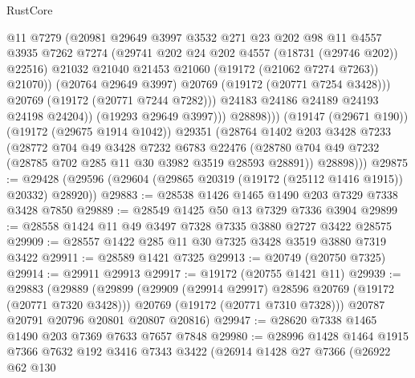 \begin{lexlean}{RustCore}
\begin{coremodule}
                          @11
                          @7279
                          (@20981
                            @29649
                            @3997
                            @3532
                            @271
                            @23
                            @202
                            @98
                            @11
                            @4557
                            @3935
                            @7262
                            @7274
                            (@29741 @202 @24 @202 @4557 (@18731 (@29746 @202)) @22516)
                            @21032
                            @21040
                            @21453
                            @21060
                            (@19172 (@21062 @7274 @7263))
                            @21070))
                        (@20764 @29649 @3997)
                        @20769
                        (@19172 (@20771 @7254 @3428)))
                      @20769
                      (@19172 (@20771 @7244 @7282)))
                    @24183
                    @24186
                    @24189
                    @24193
                    @24198
                    @24204))
                (@19293 @29649 @3997)))
            @28898)))
      (@19147 (@29671 @190))
      (@19172 (@29675 @1914 @1042))
      @29351
      (@28764
        @1402
        @203
        @3428
        @7233
        (@28772
          @704
          @49
          @3428
          @7232
          @6783
          @22476
          (@28780 @704 @49 @7232 (@28785 @702 @285 @11 @30 @3982 @3519 @28593 @28891))
          @28898)))
@29875 := @29428 (@29596 (@29604 (@29865 @20319 (@19172 (@25112 @1416 @1915)) @20332) @28920))
@29883 := @28538 @1426 @1465 @1490 @203 @7329 @7338 @3428 @7850
@29889 := @28549 @1425 @50 @13 @7329 @7336 @3904
@29899 := @28558 @1424 @11 @49 @3497 @7328 @7335 @3880 @2727 @3422 @28575
@29909 := @28557 @1422 @285 @11 @30 @7325 @3428 @3519 @3880 @7319 @3422
@29911 := @28589 @1421 @7325
@29913 := @20749 (@20750 @7325)
@29914 := @29911 @29913
@29917 := @19172 (@20755 @1421 @11)
@29939 := @29883
    (@29889
      (@29899
        (@29909 (@29914 @29917) @28596 @20769 (@19172 (@20771 @7320 @3428)))
        @20769
        (@19172 (@20771 @7310 @7328)))
      @20787
      @20791
      @20796
      @20801
      @20807
      @20816)
@29947 := @28620 @7338 @1465 @1490 @203 @7369 @7633 @7657 @7848
@29980 := @28996
    @1428
    @1464
    @1915
    @7366
    @7632
    @192
    @3416
    @7343
    @3422
    (@26914
      @1428
      @27
      @7366
      (@26922
        @62
        @130

\end{coremodule}
\end{lexlean}
